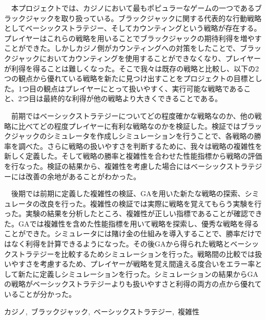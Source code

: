 \documentclass[11pt,a4paper,oneside]{jsbook}
\begin{document}
\maketitle
{}
\fontsize{10}{18}\selectfont
\frontmatter

\begin{jabstract} 
\ \ 本プロジェクトでは、カジノにおいて最もポピュラーなゲームの一つであるブラックジャックを取り扱っている。ブラックジャックに関する代表的な行動戦略としてベーシックストラテジー、そしてカウンティングという戦略が存在する。プレイヤーはこれらの戦略を用いることでブラックジャックの期待利得を増やすことができた。しかしカジノ側がカウンティングへの対策をしたことで、ブラックジャックにおいてカウンティングを使用することができなくなり、プレイヤーが利得を得ることは難しくなった。そこで我々は既存の戦略と比較し、以下の2つの観点から優れている戦略を新たに見つけ出すことをプロジェクトの目標とした。1つ目の観点はプレイヤーにとって扱いやすく、実行可能な戦略であること、2つ目は最終的な利得が他の戦略より大きくできることである。

\ \ 前期ではベーシックストラテジーについてどの程度確かな戦略なのか、他の戦略に比べてどの程度プレイヤーに有利な戦略なのかを検証した。検証ではブラックジャックのシミュレータを作成しシミュレーションを行うことで、各戦略の勝率を調べた。さらに戦略の扱いやすさを判断するために、我々は戦略の複雑性を新しく定義した。そして戦略の勝率と複雑性を合わせた性能指標から戦略の評価を行なった。検証の結果から、複雑性を考慮した場合にはベーシックストラテジーには改善の余地があることがわかった。

\ \ 後期では前期に定義した複雑性の検証、GAを用いた新たな戦略の探索、シミュレータの改良を行った。複雑性の検証では実際に戦略を覚えてもらう実験を行った。実験の結果を分析したところ、複雑性が正しい指標であることが確認できた。GAでは複雑性を含めた性能指標を用いて戦略を探索し、優秀な戦略を得ることができた。シミュレータには賭け金の仕組みを導入することで、勝率だけではなく利得を計算できるようになった。その後GAから得られた戦略とベーシックストラテジーを比較するためシミュレーションを行った。戦略間の比較では扱いやすさを考慮するため、プレイヤーが戦略を覚え間違える度合いをエラー率として新たに定義しシミュレーションを行った。シミュレーションの結果からGAの戦略がベーシックストラテジーよりも扱いやすさと利得の両方の点から優れていることが分かった。

\begin{jkeyword}
カジノ,\ ブラックジャック,\ ベーシックストラテジー,\ 複雑性
\end{jkeyword}
\end{jabstract}
\end{document}
